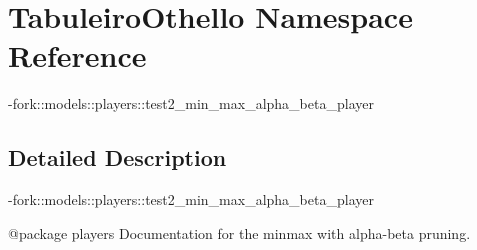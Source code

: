 \hypertarget{namespace_tabuleiro_othello}{}\section{Tabuleiro\+Othello Namespace Reference}
\label{namespace_tabuleiro_othello}


-\/fork\+::models\+::players\+::test2\+\_\+min\+\_\+max\+\_\+alpha\+\_\+beta\+\_\+player  




\subsection{Detailed Description}
-\/fork\+::models\+::players\+::test2\+\_\+min\+\_\+max\+\_\+alpha\+\_\+beta\+\_\+player 

\begin{DoxyVerb}@package players
Documentation for the minmax with alpha-beta pruning.
\end{DoxyVerb}
 